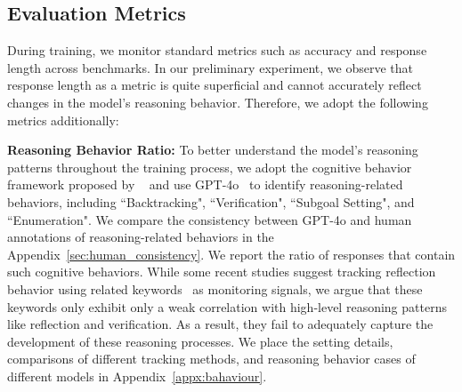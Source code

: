 

\subsection{Evaluation Metrics}
\label{sec:eval_metrics}
During training, we monitor standard metrics such as accuracy and response length across benchmarks. In our preliminary experiment, we observe that response length as a metric is quite superficial and cannot accurately reflect changes in the model's reasoning behavior. Therefore, we adopt the following metrics additionally:

\textbf{Reasoning Behavior Ratio: }To better understand the model's reasoning patterns throughout the training process, we adopt the cognitive behavior framework proposed by ~\citet{gandhi2025cognitive} and use GPT-4o~\citep{hurst2024gpt} to identify reasoning-related behaviors, including ``Backtracking", ``Verification", ``Subgoal Setting", and ``Enumeration". We compare the consistency between GPT-4o and human annotations of reasoning-related behaviors in the Appendix~\ref{sec:human_consistency}.
We report the ratio of responses that contain such cognitive behaviors.
While some recent studies suggest tracking reflection behavior using related keywords~\citep{yeo2025demystifying,xie2025logic} as monitoring signals, we argue that these keywords only exhibit only a weak correlation with high-level reasoning patterns like reflection and verification. As a result, they fail to adequately capture the development of these reasoning processes. We place the setting details, comparisons of different tracking methods, and reasoning behavior cases of different models in Appendix~\ref{appx:bahaviour}.



